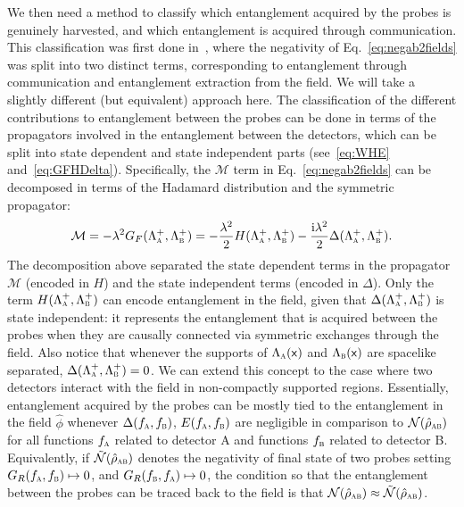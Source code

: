 \documentclass[letterpaper,12pt,titlepage,oneside,final]{book}
\newcommand{\mf}{\mathsf}%
\newcommand{\ii}{\mathrm{i}}
\renewcommand{\r}{\hat{\rho}}
\newcommand{\tc}[1]{\textsc{#1}}
\begin{document}
    We then need a method to classify which entanglement acquired by the probes is genuinely harvested, and which entanglement is acquired through communication. This classification was first done in~\cite{ericksonNew}, where the negativity of Eq.~\eqref{eq:negab2fields} was split into two distinct terms, corresponding to entanglement through communication and entanglement extraction from the field. We will take a slightly different (but equivalent) approach here. The classification of the different contributions to entanglement between the probes can be done in terms of the propagators involved in the entanglement between the detectors, which can be split into state dependent and state independent parts (see~\eqref{eq:WHE} and~\eqref{eq:GFHDelta}). Specifically, the $\mathcal{M}$ term in Eq.~\eqref{eq:negab2fields} can be decomposed in terms of the Hadamard distribution and the symmetric propagator:
    \begin{equation}
        \mathcal{M} =  - \lambda^2 G_F(\Lambda_\tc{a}^+,\Lambda_\tc{b}^+) = - \frac{\lambda^2}{2}H(\Lambda_\tc{a}^+,\Lambda_\tc{b}^+) - \frac{\ii \lambda^2}{2} \Delta(\Lambda_\tc{a}^+,\Lambda_\tc{b}^+). 
    \end{equation}
    The decomposition above separated the state dependent terms in the propagator $\mathcal{M}$ (encoded in $H$) and the state independent terms (encoded in $\Delta$). Only the term $H(\Lambda_\tc{a}^+,\Lambda_\tc{b}^+)$ can encode entanglement in the field, given that $\Delta(\Lambda_\tc{a}^+,\Lambda_\tc{b}^+)$ is state independent: it represents the entanglement that is acquired between the probes when they are causally connected via symmetric exchanges through the field. Also notice that whenever the supports of $\Lambda_\tc{a}(\mf x)$ and $\Lambda_\tc{b}(\mf x)$ are spacelike separated, $\Delta(\Lambda_\tc{a}^+,\Lambda_\tc{b}^+) = 0$. We can extend this concept to the case where two detectors interact with the field in non-compactly supported regions. Essentially, entanglement acquired by the probes can be mostly tied to the entanglement in the field $\hat{\phi}$ whenever $\Delta(f_\tc{a},f_\tc{b})$, $E(f_\tc{a},f_\tc{b})$ are negligible in comparison to $\mathcal{N}(\hat{\rho}_\tc{ab})$ for all functions $f_\tc{a}$ related to detector A and functions $f_\tc{b}$ related to detector B. Equivalently,  if $\tilde{\mathcal{N}}(\hat{\rho}_\tc{ab})$ denotes the negativity of final state of two probes setting $G_R(f_\tc{a},f_\tc{b})\mapsto 0$, and $G_R(f_\tc{b},f_\tc{a})\mapsto 0$, the condition so that the entanglement between the probes can be traced back to the field is that $\mathcal{N}(\r_\tc{ab}) \approx \tilde{\mathcal{N}}(\r_\tc{ab})$.
\end{document}
